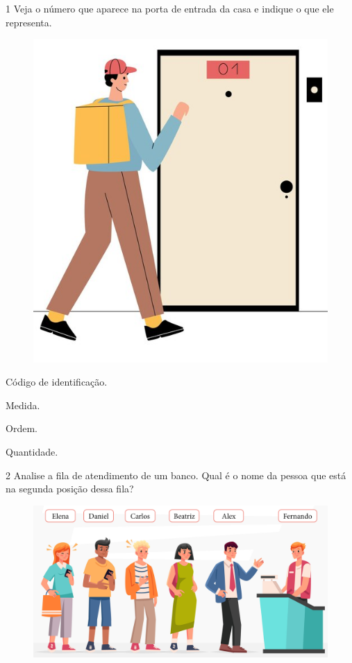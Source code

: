 
\num{1} Veja o número que aparece na porta de entrada da casa e indique o que
ele representa.

\begin{figure}[H]
\centering
\includegraphics[width=.6\textwidth]{./media/image105old.png}
\end{figure}


\begin{escolha}[itemsep=-5pt]
\begin{multicols}{2}
\item Código de identificação.

\item Medida.

\item Ordem.

\item Quantidade.
\end{multicols}
\end{escolha}

\num{2} Analise a fila de atendimento de um banco. Qual é o nome da pessoa que
está na segunda posição dessa fila?

\begin{figure}[H]
\centering
\includegraphics[width=.8\textwidth]{./media/image113.png}
\end{figure}

